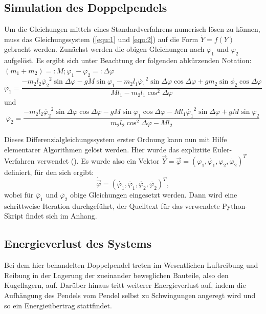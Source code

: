 \subsection{Simulation des Doppelpendels}
Um die Gleichungen mittels eines Standardverfahrens numerisch lösen zu können, muss das Gleichungssystem (\ref{equ:1} und \ref{equ:2}) auf die Form $ \dot{Y} = f(Y) $ gebracht werden. Zunächst werden die obigen Gleichungen nach $ \ddot{\varphi_1} $ und $ \ddot{\varphi_2} $ aufgelöst. Es ergibt sich unter Beachtung der folgenden abkürzenden Notation: 
$ (m_1 + m_2) =: M; \varphi_1 - \varphi_2 =: \Delta \varphi $
\begin{equation}
\ddot{\varphi_1} = \frac{-m_2 l_2 \dot{\varphi_2}^{2} \sin{\Delta \varphi} - g M \sin{\varphi_1} - m_2 l_1 \dot{\varphi_1}^{2} \sin{\Delta \varphi} \cos{\Delta \varphi} + g m_2 \sin{\phi_2}\cos{\Delta  \varphi}}{M l_1 - m_2 l_1 \cos^{2}{\Delta \varphi}}
\end{equation}
und
\begin{equation} 
\ddot{\varphi_2} = \frac{-m_2 l_2 \dot{\varphi_2}^{2} \sin{\Delta \varphi} \cos{\Delta \varphi} - g M \sin{\varphi_1} \cos{\Delta \varphi} - M l_1 \dot{\varphi_1}^{2} \sin{\Delta \varphi} + g M \sin{\varphi_2}}{m_2 l_2 \cos^{2}{\Delta \varphi} - M l_2}
\end{equation}

Dieses Differenzialgleichungssystem erster Ordnung kann nun mit Hilfe elementarer Algorithmen gelöst werden. Hier wurde das expliztite Euler-Verfahren verwendet (\cite{eul}). Es wurde also ein Vektor $\vec{Y} = \vec{\varphi} = (
\varphi_1, \dot{\varphi_1}, \varphi_2 , \dot{\varphi_2})^{T} $
 definiert, für den sich ergibt: 
\begin{equation}
\dot{\vec{\varphi}} = (\dot{\varphi_1}, \ddot{\varphi_1}, \dot{\varphi_2}, \ddot{\varphi_2})^{T},
\end{equation}
wobei für $ \ddot{\varphi_1} $ und $ \ddot{\varphi_2} $ obige Gleichungen eingesetzt werden. 
Dann wird eine schrittweise Iteration durchgeführt, der Quelltext für das verwendete Python-Skript findet sich im Anhang. 

\subsection{Energieverlust des Systems}
Bei dem hier behandelten Doppelpendel treten im Wesentlichen Luftreibung und Reibung in der Lagerung der zueinander beweglichen Bauteile, also den Kugellagern, auf. Darüber hinaus tritt weiterer Energieverlust auf, indem die Aufhängung des Pendels vom Pendel selbst zu Schwingungen angeregt wird und so ein Energieübertrag stattfindet. 

